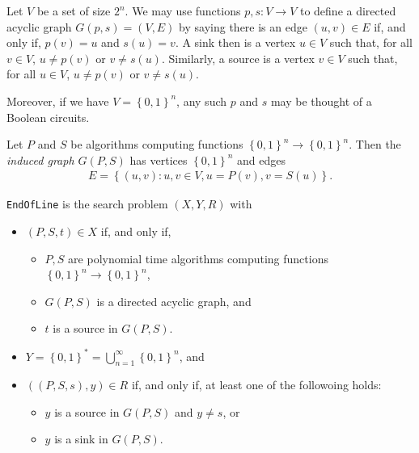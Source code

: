 \documentclass{article}
\begin{document}
Let $V$ be a set of size $2^n$. We may use functions
$p,s:V\to V$ to define a directed acyclic graph $G(p,s)=(V,E)$ by
saying there is an edge $(u,v)\in E$ if, and only if, $p(v)=u$
and $s(u)=v$. A sink then is a vertex $u\in V$ such that,
for all $v\in V$, $u\neq p(v)$ or $v\neq s(u)$. Similarly,
a source is a vertex $v\in V$ such that, for all $u\in V$,
$u\neq p(v)$ or $v\neq s(u)$.

Moreover, if we have $V=\left\lbrace{0,1}\right\rbrace^n$,
any such $p$ and $s$ may be thought of a Boolean circuits.

\begin{definition}
  Let $P$ and $S$ be algorithms computing functions
  $\left\lbrace{0,1}\right\rbrace^n\to\left\lbrace{0,1}\right\rbrace^n$.
  Then the \emph{induced graph $G(P,S)$} has vertices $\left\lbrace{0,1}\right\rbrace^n$
  and edges
  \begin{align*}
    E = \left\lbrace{(u,v) : u,v\in V, u=P(v), v=S(u)}\right\rbrace.
  \end{align*}
\end{definition}

\begin{definition}
  \texttt{EndOfLine} is the search problem $(X,Y,R)$ with
  \begin{itemize}
    \item $(P,S,t)\in X$ if, and only if,
      \begin{itemize}
        \item $P,S$ are polynomial time algorithms computing
          functions $\left\lbrace{0,1}\right\rbrace^n\to\left\lbrace{0,1}\right\rbrace^n$,
        \item $G(P,S)$ is a directed acyclic graph, and
        \item $t$ is a source in $G(P,S)$.
      \end{itemize}
    \item $Y = \left\lbrace{0,1}\right\rbrace^* = \bigcup_{n=1}^\infty \left\lbrace{0,1}\right\rbrace^n$, and
    \item $((P,S,s),y)\in R$ if, and only if, at least one of the followoing holds:
      \begin{itemize}
        \item $y$ is a source in $G(P,S)$ and $y\neq s$, or
        \item $y$ is a sink in $G(P,S)$.
      \end{itemize}
  \end{itemize}
\end{definition}
\end{document}
